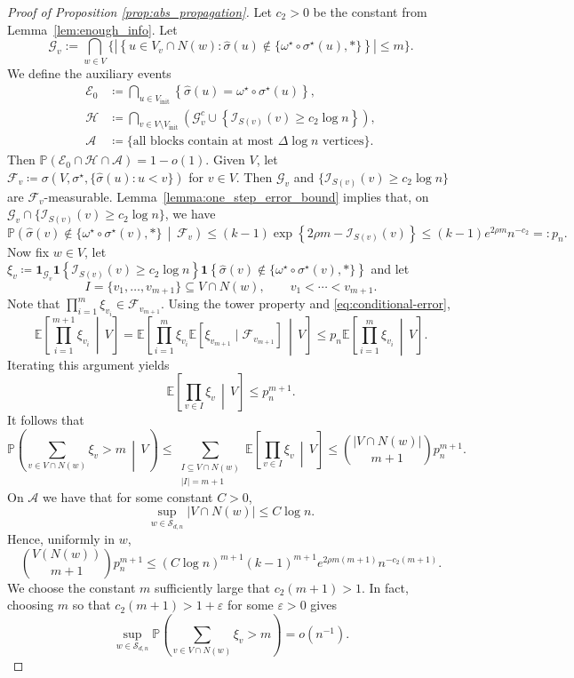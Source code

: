 \documentclass[11pt, a4paper]{amsart}
\renewcommand{\P}{\mathbb{P}}
\newcommand{\E}{\mathbb{E}}
\newcommand{\1}{\mathbf{1}}
\theoremstyle{definition}
\theoremstyle{remark}
\theoremstyle{definition}
\begin{document}
\begin{proof}[Proof of Proposition \ref{prop:abs_propagation}]
Let $c_2>0$ be the constant from Lemma~\ref{lem:enough_info}. Let
\[
\mathcal G_v:= \bigcap_{w\in V}
\{
\left|
\left\{
u\in V_v\cap N(w):
\widehat\sigma(u)
\notin
\{\omega^\star\circ\sigma^\star(u),*\}
\right\}
\right|
\le m
\}.
\]
We
define the auxiliary events
\begin{align*}
\mathcal E_0
&\coloneqq
\bigcap_{u\in V_{\mathrm{init}}}
\left\{
\widehat\sigma(u)=\omega^\star\circ\sigma^\star(u)
\right\},\\
\mathcal H &\coloneqq \bigcap_{v\in V \setminus V_{\mathrm{init}}}
\left(
\mathcal G_v^c
\cup
\left\{
\mathcal I_{S(v)}(v)\ge c_2\log n
\right\}
\right),\\
\mathcal A &\coloneqq \{\text{all blocks contain at most }\Delta \log n\text{ vertices} \}.
\end{align*}
Then $\P(\mathcal E_0 \cap \mathcal H \cap \mathcal A)=1-o(1)$. Given $V$, let \(
\mathcal F_v
\coloneqq
\sigma\left(
V,\sigma^\star,
\{\widehat\sigma(u):u<v\}
\right)\) for $v \in V$. Then $\mathcal G_v$ and $\{
\mathcal I_{S(v)}(v)\ge c_2\log n\}$ are $\mathcal F_v$-measurable. Lemma~\ref{lemma:one_step_error_bound} implies that, on $\mathcal G_v\cap \{ \mathcal I_{S(v)}(v)\ge c_2\log n \}$,
we have
\begin{equation}
\label{eq:conditional-error}
\P\left(
\widehat\sigma(v)
\notin
\{\omega^\star\circ\sigma^\star(v),*\}
\,\middle|\,
\mathcal F_v
\right)
\le
(k-1)\exp\left\{
2\rho m-\mathcal I_{S(v)}(v)
\right\}
\le
(k-1)e^{2\rho m}n^{-c_2}=:p_n.
\end{equation}
Now fix $w\in V$, let $\xi_v
\coloneqq
\1_{\mathcal G_v}
\1\left\{
\mathcal I_{S(v)}(v)\ge c_2\log n
\right\}
\1\left\{
\widehat\sigma(v)
\notin
\{\omega^\star\circ\sigma^\star(v),*\}
\right\}$ and let
\[
I=\{v_1,\ldots,v_{m+1}\}
\subseteq V\cap N(w),
\qquad
v_1<\cdots<v_{m+1}.
\]
Note that \(\prod_{i=1}^{m}\xi_{v_i}
\in
\mathcal F_{v_{m+1}}\). Using the tower property and \eqref{eq:conditional-error},
\[
\E\left[
\prod_{i=1}^{m+1}\xi_{v_i}
\,\middle|\,V
\right]
=
\E\left[
\prod_{i=1}^{m}\xi_{v_i}
\E\left[
\xi_{v_{m+1}}
\mid
\mathcal F_{v_{m+1}}
\right]
\,\middle|\,V
\right]
\le
p_n
\E\left[
\prod_{i=1}^{m}\xi_{v_i}
\,\middle|\,V
\right].
\]
Iterating this argument yields
\[
\label{eq:product-bound}
\E\left[
\prod_{v\in I}\xi_v
\,\middle|\,V
\right]
\le
p_n^{m+1}.
\]
It follows that
\[
\P\left(
\sum_{v\in V\cap N(w)}\xi_v>m
\,\middle|\,V
\right)
\le
\sum_{\substack{
I\subseteq V\cap N(w)\\
|I|=m+1
}}
\E\left[
\prod_{v\in I}\xi_v
\,\middle|\,V
\right]
\le
\binom{|V\cap N(w)|}{m+1}p_n^{m+1}.
\]
On $\mathcal A$ we have that for some constant $C>0$,
\[
\sup_{w\in\mathcal S_{d,n}}
|V\cap N(w)|
\le C\log n.
\]
Hence, uniformly in $w$,
\[
\binom{V(N(w))}{m+1}p_n^{m+1}
\le
(C\log n)^{m+1} (k-1)^{m+1}
e^{2\rho m(m+1)}
n^{-c_2(m+1)}.
\]
We choose the constant $m$ sufficiently large that $c_2(m+1)>1$. In fact, choosing $m$ so that $c_2(m+1)>1+\varepsilon$ for some
$\varepsilon>0$ gives
\begin{equation}
\label{eq:local-tilde}
\sup_{w\in\mathcal S_{d,n}}
\P\left(
\sum_{v\in V\cap N(w)}\xi_v>m
\right)
=o(n^{-1}).
\end{equation}


\end{proof}
\end{document}
